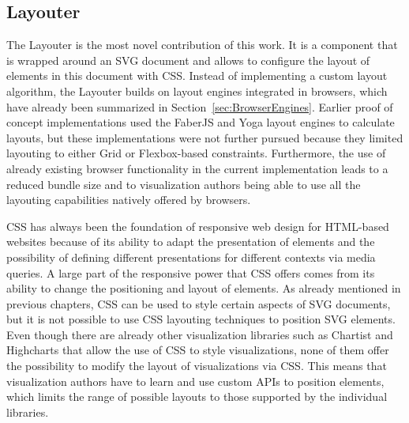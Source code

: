 \subsection{Layouter}
\label{sec:Layouter}

The Layouter is the most novel contribution of this work.
It is a component that is wrapped around an SVG document and allows to configure the layout of elements in this document with CSS.
Instead of implementing a custom layout algorithm, the Layouter builds on layout engines integrated in browsers, which have already been summarized in Section~\ref{sec:BrowserEngines}.
Earlier proof of concept implementations used the FaberJS \parencite{FaberJS} and Yoga \parencite{Yoga} layout engines to calculate layouts, but these implementations were not further pursued because they limited layouting to either Grid or Flexbox-based constraints.
Furthermore, the use of already existing browser functionality in the current implementation leads to a reduced bundle size and to visualization authors being able to use all the layouting capabilities natively offered by browsers.

CSS has always been the foundation of responsive web design for HTML-based websites because of its ability to adapt the presentation of elements and the possibility of defining different presentations for different contexts via media queries.
A large part of the responsive power that CSS offers comes from its ability to change the positioning and layout of elements.
As already mentioned in previous chapters, CSS can be used to style certain aspects of SVG documents, but it is not possible to use CSS layouting techniques to position SVG elements.
Even though there are already other visualization libraries such as Chartist \parencite{Chartist} and Highcharts \parencite{Highcharts} that allow the use of CSS to style visualizations, none of them offer the possibility to modify the layout of visualizations via CSS.
This means that visualization authors have to learn and use custom APIs to position elements, which limits the range of possible layouts to those supported by the individual libraries. 

